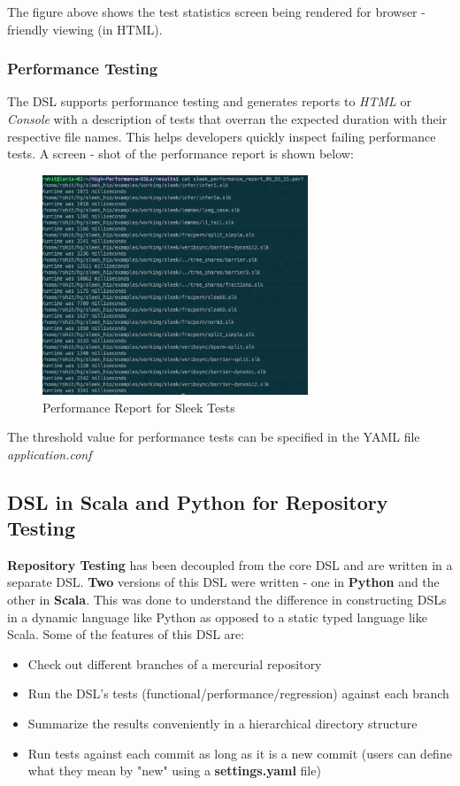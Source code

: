 \noindent
The figure above shows the test statistics screen being rendered for browser - friendly viewing (in HTML). 

\subsubsection{Performance Testing}

The DSL supports performance testing and generates reports to \textit{HTML} or \textit{Console} with a description of tests that overran the expected duration with their respective file names. This helps developers quickly inspect failing performance tests. A screen - shot of the performance report is shown below:

\begin{figure}[H]
  \centering
    \includegraphics[width=300px]{figures/performance_testing.png}
  \caption{Performance Report for Sleek Tests}
\end{figure}

\noindent
The threshold value for performance tests can be specified in the YAML file \textit{application.conf}

\subsection{DSL in Scala and Python for Repository Testing}

\noindent
\textbf{Repository Testing} has been decoupled from the core DSL and are written in a separate DSL. \textbf{Two} versions of this DSL were written - one in \textbf{Python} and the other in \textbf{Scala}. This was done to understand the difference in constructing DSLs in a dynamic language like Python as opposed to a static typed language like Scala. Some of the features of this DSL are: 
\begin{itemize}
\item Check out different branches of a mercurial repository
\item Run the DSL's tests (functional/performance/regression) against each branch
\item Summarize the results conveniently in a hierarchical directory
structure
\item Run tests against each commit as long as it is a new commit (users can define what they mean by "new" using a \textbf{settings.yaml } file)
\end{itemize}

